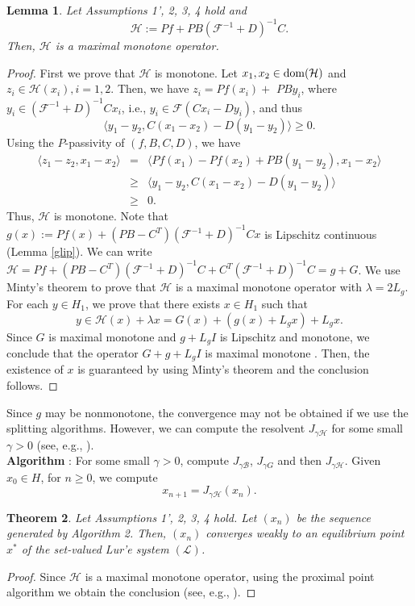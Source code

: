 \documentclass[11pt]{article}
\def\beq{\begin{equation}}
\def\eeq{\end{equation}}
\def\baqn{\begin{eqnarray*}}
\def\eaqn{\end{eqnarray*}}
\theoremstyle{plain}
\newtheorem{theorem}{Theorem}
\newtheorem{lemma}[theorem]{Lemma}
\begin{document}
{ \begin{lemma} 
Let Assumptions 1', 2, 3, 4 hold and
\beq
\mathcal{H}:=Pf+PB(\mathcal{F}^{-1}+D)^{-1}C.
\eeq
Then, $\mathcal{H}$ is a maximal monotone operator. 
   \end{lemma} 
 \begin{proof}
 First we prove that $\mathcal{H}$ is monotone. Let 
 $x_1, x_2 \in {\rm dom}(\mathcal{H})$ and
  $z_i \in \mathcal{H}(x_i), i=1, 2$. Then, we have 
 $z_i=Pf(x_i)+$ {{$PBy_i$}}, where  $y_i\in (\mathcal{F}^{-1}+D)^{-1}Cx_i$, {{i.e.,}} $y_i\in \mathcal{F}(Cx_i-Dy_i)$, and thus 
 $$
\langle y_1-y_2, C(x_1-x_2) -D(y_1-y_2) \rangle \ge 0.
$$
Using the $P$-passivity of $(f,B, C, D)$, we have
\baqn
\langle z_1-z_2, x_1-x_2 \rangle &=& \langle Pf(x_1)-Pf(x_2)+PB (y_1-y_2), x_1-x_2 \rangle\\
& \ge & \langle y_1-y_2, C(x_1-x_2) -D(y_1-y_2) \rangle \\
&\ge & 0.
\eaqn
Thus, $\mathcal{H}$ is monotone. 
 Note that $g(x):=Pf(x)+(PB-C^T)(\mathcal{F}^{-1}+D)^{-1}Cx$ is Lipschitz continuous (Lemma \ref{glip}). We can write $\mathcal{H}=Pf+(PB-C^T)(\mathcal{F}^{-1}+D)^{-1}C+C^T(\mathcal{F}^{-1}+D)^{-1}C=g+G$. We use Minty's theorem to prove that $\mathcal{H}$ is a maximal monotone operator with $\lambda = 2L_g$.  For each $y\in H_1$, we prove that there exists $x\in H_1$ such that 
 $$
 y\in \mathcal{H}(x)+\lambda x=G(x)+(g(x)+L_g x)+L_g x.
 $$
Since $G$ is maximal monotone and $g+L_g I$ is Lipschitz and monotone, we conclude that the operator $G+g+L_g I$ is maximal monotone  \cite[Lemma 2.4]{Brezis}. Then, the existence of $x$ is guaranteed by using Minty's theorem and the conclusion follows.  
 \end{proof}  
 
  Since $g$ may be nonmonotone, the convergence may not be obtained if we use the splitting algorithms. However, we can compute the resolvent  $J_{\gamma \mathcal{H}}$ for some small $\gamma >0$ (see, e.g., \cite{LT}). \\

   \noindent \textbf{Algorithm }: For some small $\gamma >0 $, compute $J_{\gamma \mathcal{B}}$, $J_{\gamma G}$ and then $J_{\gamma \mathcal{H}}$. Given $x_0\in H$, for $n\ge 0$, we compute \\
 $$
 x_{n+1}=J_{\gamma \mathcal{H}}(x_n).
 $$ 


   \begin{theorem}
  Let Assumptions 1', 2, 3, 4 hold. Let $(x_n)$ be the sequence generated by  Algorithm 2. Then, $(x_n)$ converges weakly to an equilibrium point $x^*$ of the {{set-valued Lur'e  system}} $({\mathcal L})$.
 \end{theorem} 
\begin{proof}
Since $\mathcal{H}$ is a maximal monotone operator, using the proximal point algorithm we obtain the conclusion (see, e.g., \cite{Rockafellar}). 
\end{proof}

}
\end{document}
